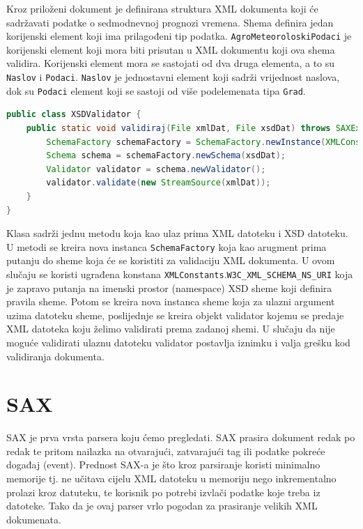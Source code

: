 \documentclass{foi}
\begin{document}
Kroz priloženi dokument je definirana struktura XML dokumenta koji će sadržavati podatke
o sedmodnevnoj prognozi vremena. Shema definira jedan korijenski element koji ima prilagođeni tip podatka.
\texttt{AgroMeteoroloskiPodaci} je korijenski element koji mora biti prisutan u XML dokumentu
koji ova shema validira. Korijenski element mora se sastojati od dva druga elementa, a to su
\texttt{Naslov} i \texttt{Podaci}. \texttt{Naslov} je jednostavni element koji sadrži vrijednost
naslova, dok su \texttt{Podaci} element koji se sastoji od više podelemenata tipa \texttt{Grad}.

\begin{lstlisting}[language=java, caption={Klasa za validaciju XML datoteke prema XSD shemi}]
public class XSDValidator {
    public static void validiraj(File xmlDat, File xsdDat) throws SAXException, IOException {
        SchemaFactory schemaFactory = SchemaFactory.newInstance(XMLConstants.W3C_XML_SCHEMA_NS_URI);
        Schema schema = schemaFactory.newSchema(xsdDat);
        Validator validator = schema.newValidator();
        validator.validate(new StreamSource(xmlDat));
    }
}
\end{lstlisting}

Klasa sadrži jednu metodu koja kao ulaz prima XML datoteku i XSD datoteku.
U metodi se kreira nova instanca \texttt{SchemaFactory} koja kao arugment prima putanju
do sheme koja će se koristiti za validaciju XML dokumenta. U ovom slučaju se koristi
ugrađena konstana \texttt{XMLConstants$.$W3C\_XML\_SCHEMA\_NS\_URI} koja je zapravo
putanja na imenski prostor (namespace) XSD sheme koji definira pravila sheme.
Potom se kreira nova instanca sheme koja za ulazni argument uzima datoteku
sheme, poslijednje se kreira objekt validator kojemu se predaje XML datoteka koju
želimo validirati prema zadanoj shemi. U slučaju da nije moguće validirati ulaznu
datoteku validator postavlja iznimku i valja grešku kod validiranja dokumenta.

\section{SAX}
SAX je prva vrsta parsera koju ćemo pregledati. SAX prasira dokument redak po redak
te pritom nailazka na otvarajući, zatvarajući tag ili podatke pokreće događaj (event).
Prednost SAX-a je što kroz parsiranje koristi minimalno memorije tj. ne učitava cijelu
XML datoteku u memoriju nego inkrementalno prolazi kroz datuteku, te korisnik po potrebi
izvlači podatke koje treba iz datoteke. Tako da je ovaj parser vrlo pogodan za prasiranje
velikih XML dokumenata.
\end{document}
